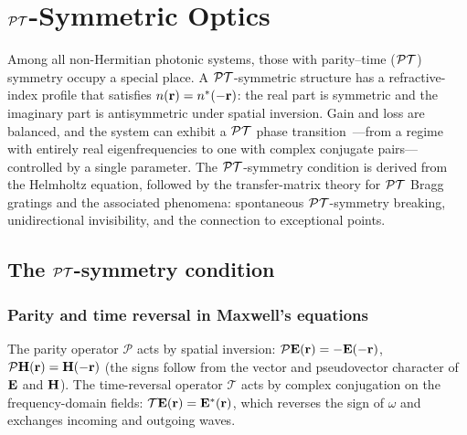 \chapter{$\mathcal{PT}$-Symmetric Optics}
\label{ch:pt-symmetric}

\begin{chapterlead}
Among all non-Hermitian photonic systems, those with parity--time ($\mathcal{PT}$)
symmetry occupy a special place. A $\mathcal{PT}$-symmetric structure has a
refractive-index profile that satisfies $n(\mathbf{r}) = n^*(-\mathbf{r})$: the real
part is symmetric and the imaginary part is antisymmetric under spatial
inversion. Gain and loss are balanced, and the system can exhibit a
$\mathcal{PT}$ phase transition~\cite{elganainy2007theory}---from a regime with entirely real
eigenfrequencies to one with complex conjugate pairs---controlled by a
single parameter. The $\mathcal{PT}$-symmetry condition is derived from the
Helmholtz equation, followed by the transfer-matrix theory for $\mathcal{PT}$
Bragg gratings and the associated phenomena: spontaneous
$\mathcal{PT}$-symmetry breaking, unidirectional invisibility, and the connection
to exceptional points.
\end{chapterlead}


\section{The $\mathcal{PT}$-symmetry condition}
\label{sec:pt-condition}

\subsection{Parity and time reversal in Maxwell's equations}
\label{ssec:pt-maxwell}

The parity operator $\mathcal{P}$ acts by spatial inversion:
$\mathcal{P}\mathbf{E}(\mathbf{r}) = -\mathbf{E}(-\mathbf{r})$, $\mathcal{P}\mathbf{H}(\mathbf{r}) = \mathbf{H}(-\mathbf{r})$
(the signs follow from the vector and pseudovector character of $\mathbf{E}$ and
$\mathbf{H}$). The time-reversal operator $\mathcal{T}$ acts by complex
conjugation on the frequency-domain fields: $\mathcal{T}\mathbf{E}(\mathbf{r}) =
\mathbf{E}^*(\mathbf{r})$, which reverses the sign of $\omega$ and exchanges incoming
and outgoing waves.


